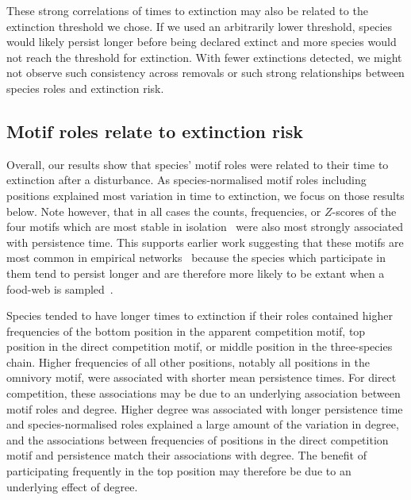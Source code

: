 \documentclass[12pt]{article}
\begin{document}
\begin{spacing}{2.0}
        These strong correlations of times to extinction may also be related to the extinction threshold we chose.
        If we used an arbitrarily lower threshold, species would likely persist longer before being declared extinct and more species would not reach the threshold for extinction.
        With fewer extinctions detected, we might not observe such consistency across removals or such strong relationships between species roles and extinction risk.


	\subsection*{Motif roles relate to extinction risk}

		Overall, our results show that species' motif roles were related to their time to extinction after a disturbance.
        As species-normalised motif roles including positions explained most variation in time to extinction, we focus on those results below. 
        Note however, that in all cases the counts, frequencies, or $Z$-scores of the four motifs which are most stable in isolation~\citep{Borrelli2015a} were also most strongly associated with persistence time.
        This supports earlier work suggesting that these motifs are most common in empirical networks~\citep{Stouffer2007} because the species which participate in them tend to persist longer and are therefore more likely to be extant when a food-web is sampled~\citep{Borrelli2015}.
        

        Species tended to have longer times to extinction if their roles contained higher frequencies of the bottom position in the apparent competition motif, top position in the direct competition motif, or middle position in the three-species chain.
        Higher frequencies of all other positions, notably all positions in the omnivory motif, were associated with shorter mean persistence times.
        For direct competition, these associations may be due to an underlying association between motif roles and degree. 
        Higher degree was associated with longer persistence time and species-normalised roles explained a large amount of the variation in degree, and the associations between frequencies of positions in the direct competition motif and persistence match their associations with degree.
        The benefit of participating frequently in the top position may therefore be due to an underlying effect of degree.  
        

\end{spacing}
\end{document}
